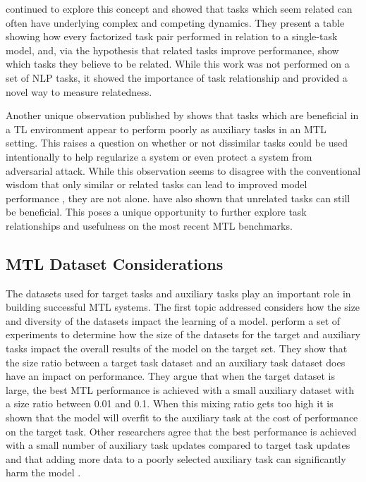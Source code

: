 \documentclass[twocolumn]{article}
\begin{document}
\cite{whichtask19} continued to explore this concept and showed that tasks which seem related can often have underlying complex and competing dynamics. They present a table showing how every factorized task pair performed in relation to a single-task model, and, via the hypothesis that related tasks improve performance, show which tasks they believe to be related. While this work was not performed on a set of NLP tasks, it showed the importance of task relationship and provided a novel way to measure relatedness. 

Another unique observation published by \cite{whichtask19} shows that tasks which are beneficial in a TL environment appear to perform poorly as auxiliary tasks in an MTL setting. This raises a question on whether or not dissimilar tasks could be used intentionally to help regularize a system or even protect a system from adversarial attack. While this observation seems to disagree with the conventional wisdom that only similar or related tasks can lead to improved model performance \citep{notion08}, they are not alone. \cite{unrelatedtasks12} have also shown that unrelated tasks can still be beneficial. This poses a unique opportunity to further explore task relationships and usefulness on the most recent MTL benchmarks.

\subsection{MTL Dataset Considerations}
The datasets used for target tasks and auxiliary tasks play an important role in building successful MTL systems. The first topic addressed considers how the size and diversity of the datasets impact the learning of a model. \cite{mts2sl15} perform a set of experiments to determine how the size of the datasets for the target and auxiliary tasks impact the overall results of the model on the target set. They show that the size ratio between a target task dataset and an auxiliary task dataset does have an impact on performance. They argue that when the target dataset is large, the best MTL performance is achieved with a small auxiliary dataset with a size ratio between 0.01 and 0.1. When this mixing ratio gets too high it is shown that the model will overfit to the auxiliary task at the cost of performance on the target task. Other researchers agree that the best performance is achieved with a small number of auxiliary task updates compared to target task updates \citep{whenmtl17,probing19} and that adding more data to a poorly selected auxiliary task can significantly harm the model \citep{probing19}.
\end{document}
